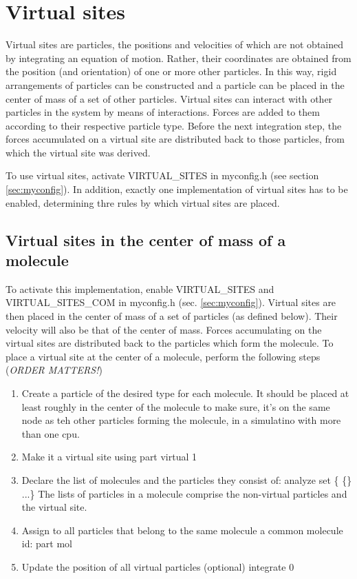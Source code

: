 \chapter{Virtual sites}
\label{sec:virtual}

Virtual sites are particles, the positions and velocities of which are not obtained by integrating an equation of motion. Rather, their coordinates are obtained from the position (and orientation) of one or more other particles. In this way, rigid arrangements of particles can be constructed and a particle can be placed in the center of mass of a set of other particles. 
Virtual sites can interact with other particles in the system by means of interactions. Forces are added to them according to their respective particle type. Before the next integration step, the forces accumulated on a virtual site are distributed back to those particles, from which the virtual site was derived.

To use virtual sites, activate VIRTUAL_SITES in myconfig.h (see section \ref{sec:myconfig}). In addition, exactly one implementation of virtual sites has to be enabled, determining thre rules by which virtual sites are placed. 


\section{Virtual sites in the center of mass of a molecule}

To activate this implementation, enable VIRTUAL_SITES and VIRTUAL_SITES_COM in myconfig.h (sec. \ref{sec:myconfig}). 
Virtual sites are then placed in the center of mass of a set of particles (as defined below). Their velocity will also be that of the center of mass. Forces accumulating on the virtual sites are distributed back to the particles which form the molecule.
To place a virtual site at the center of a molecule, perform the following steps (\emph{ORDER MATTERS!})
\begin{enumerate}
\item Create a particle of the desired type for each molecule. It should be placed at least roughly in the center of the molecule to make sure, it's on the same node as teh other particles forming the molecule, in a simulatino with more than one cpu.
\item Make it a virtual site using \newline
part  virtual 1
\item Declare the list of molecules and the particles they consist of:\newline
analyze set \{ \{\} ...\}\newline
The lists of particles in a molecule comprise the non-virtual particles and the virtual site.
\item Assign to all particles that belong to the same molecule a common molecule id:\newline
part  mol 
\item Update the position of all virtual particles (optional)\newline
integrate 0
\end{enumerate}


